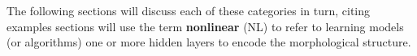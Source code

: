{The following sections will discuss each of these categories
in turn, citing examples 
sections will use the term
\textbf{nonlinear} (NL) to refer to learning
models (or algorithms) one
or more hidden layers to encode the
morphological structure.
%

%

}
